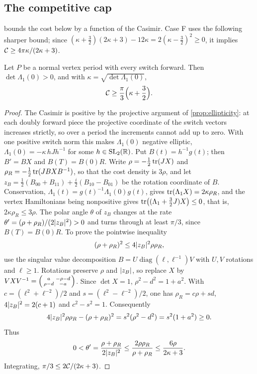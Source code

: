 \subsection{The competitive cap}

 bounds the cost below by a function of the Casimir. Case F uses the
following sharper bound; since $(\kappa+\frac32)(2\kappa+3)-12\kappa=2(\kappa-\frac32)^2\ge0$, it
implies $\mathcal{C}\ge4\pi\kappa/(2\kappa+3)$.

\begin{proposition}\label{prop:fwd-spectral}
Let $P$ be a normal vertex period with every switch forward. Then $\det\Lambda_1(0)>0$, and with
$\kappa=\sqrt{\det\Lambda_1(0)}$,
\[
\mathcal{C}\ge\frac\pi3\Bigl(\kappa+\frac32\Bigr).
\]
\end{proposition}

\begin{proof}
The Casimir is positive by the projective argument of \cref{prop:ellipticity}: at each doubly
forward piece the projective coordinate of the switch vectors increases strictly, so over a period
the increments cannot add up to zero. With one
positive switch norm this makes $\Lambda_1(0)$ negative elliptic, $\Lambda_1(0)=-\kappa\,hJh^{-1}$
for some $h\in\mathrm{SL}_2(\mathbb{R})$. Put $B(t)=h^{-1}g(t)$; then $B'=BX$ and $B(T)=B(0)R$. Write
$\rho=-\frac12\operatorname{tr}(JX)$ and $\rho_R=-\frac12\operatorname{tr}(JBXB^{-1})$, so that the cost density is $3\rho$, and
let $z_B=\frac12(B_{00}+B_{11})+\frac i2(B_{10}-B_{01})$ be the rotation coordinate of $B$.
Conservation, $\Lambda_1(t)=g(t)^{-1}\Lambda_1(0)g(t)$, gives $\operatorname{tr}(\Lambda_1X)=2\kappa\rho_R$, and
the vertex Hamiltonians being nonpositive gives $\operatorname{tr}\bigl((\Lambda_1+\frac32J)X\bigr)\le0$, that
is, $2\kappa\rho_R\le3\rho$. The polar angle $\theta$ of $z_B$ changes at the rate
$\theta'=(\rho+\rho_R)/(2\lvert z_B\rvert^2)>0$ and turns through at least $\pi/3$, since $B(T)=B(0)R$.
To prove the pointwise inequality
\begin{equation}\label{eq:fwd-spectral-key}
  (\rho+\rho_R)^2\le4\lvert z_B\rvert^2\rho\rho_R,
\end{equation}
use the singular value decomposition $B=U\operatorname{diag}(\ell,\ell^{-1})V$ with $U,V$
rotations and $\ell\ge1$. Rotations preserve $\rho$ and $\lvert z_B\rvert$, so replace $X$ by
$VXV^{-1}=\begin{psmallmatrix}a&-\rho-d\\ \rho-d&-a\end{psmallmatrix}$. Since $\det X=1$,
$\rho^2-d^2=1+a^2$. With $c=(\ell^2+\ell^{-2})/2$ and $s=(\ell^2-\ell^{-2})/2$, one has
$\rho_R=c\rho+sd$, $4\lvert z_B\rvert^2=2(c+1)$ and $c^2-s^2=1$. Consequently
\[
  4\lvert z_B\rvert^2\rho\rho_R-(\rho+\rho_R)^2
  =s^2(\rho^2-d^2)=s^2(1+a^2)\ge0.
\]
Thus
\begin{equation}\label{eq:fwd-spectral-pointwise}
  0<\theta'=\frac{\rho+\rho_R}{2\lvert z_B\rvert^2}
  \le\frac{2\rho\rho_R}{\rho+\rho_R}
  \le\frac{6\rho}{2\kappa+3}.
\end{equation}
Integrating,
$\pi/3\le2\mathcal{C}/(2\kappa+3)$.
\end{proof}

